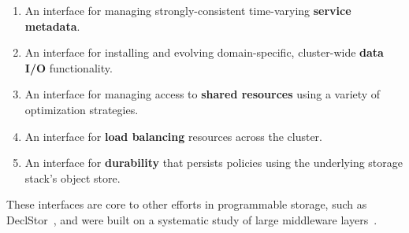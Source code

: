 \begin{enumerate}

\item An interface for managing strongly-consistent time-varying
\textbf{service metadata}.

\item An interface for installing and evolving domain-specific, cluster-wide
\textbf{data I/O} functionality.

\item An interface for managing access to \textbf{shared resources} using a
variety of optimization strategies.

\item An interface for \textbf{load balancing} resources across the cluster.

\item An interface for \textbf{durability} that persists policies using the
underlying storage stack's object store.

\end{enumerate}

These interfaces are core to other efforts in programmable storage, such as
DeclStor~\cite{watkins:hot17-declstor, watkins:techreport16-brados}, and were
built on a systematic study of large middleware
layers~\cite{watkins_invivo_2013, watkins:scc2012-datamods,
watkins_datamods_2012}.
